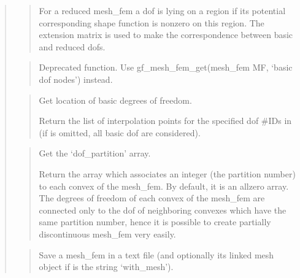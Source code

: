 \documentclass[a4paper,11pt,english]{sphinxmanual}
\begin{document}
\begin{quote}
\begin{quote}
For a reduced mesh\_fem
a dof is lying on a region if its potential corresponding shape
function is nonzero on this region. The extension matrix is used
to make the correspondence between basic and reduced dofs.
\end{quote}

\begin{quote}

Deprecated function. Use gf\_mesh\_fem\_get(mesh\_fem MF, ‘basic dof nodes’) instead.
\end{quote}

\begin{quote}

Get location of basic degrees of freedom.

Return the list of interpolation points for the specified
dof \#IDs in  (if  is omitted, all basic dof are
considered).
\end{quote}

\begin{quote}

Get the ‘dof\_partition’ array.

Return the array which associates an integer (the partition number)
to each convex of the mesh\_fem. By default, it is an all\sphinxhyphen{}zero array.
The degrees of freedom of each convex of the mesh\_fem are connected
only to the dof of neighboring convexes which have the same
partition number, hence it is possible to create partially
discontinuous mesh\_fem very easily.
\end{quote}

\begin{quote}

Save a mesh\_fem in a text file (and optionally its linked mesh object
if  is the string ‘with\_mesh’).
\end{quote}

\begin{quote}


\end{quote}
\end{quote}
\end{document}
